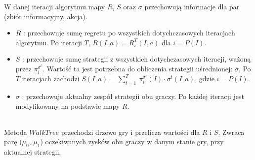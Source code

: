 \documentclass[licencjacka]{pracamgr}
\begin{document}
\noindent
W danej iteracji algorytmu mapy $R$, $S$ oraz $\sigma$ przechowują informacje
dla par (zbiór informacyjny, akcja).
\begin{itemize}
\item $R$ : przechowuje sumę regretu po wszystkich dotychczasowych iteracjach algorytmu. Po iteracji $T$, $R(I, a) = R_i^T(I, a)$
        dla $i = P(I)$.
\item $S$ : przechowuje sumę strategii z wszystkich dotychczasowych iteracji, ważoną przez $\pi_i^{\sigma^t}$. Wartość ta jest
            potrzebna do obliczenia strategii uśrednionej: $\overline{\sigma}$. Po $T$ iteracjach zachodzi
            $S(I, a) = \sum\limits_{t=1}^T \, \pi_i^{\sigma^t}(I) \cdot \sigma^t(I, a)$, gdzie $i = P(I)$.
\item $\sigma$ : przechowuje aktualny zespół strategii obu graczy. Po każdej iteracji jest modyfikowany na podstawie mapy $R$.
\end{itemize}

$\,$ \\

\noindent
Metoda $WalkTree$ przechodzi drzewo gry i przelicza wartości dla $R$ i $S$. Zwraca parę
($\mu_0$, $\mu_1$) oczekiwanych zysków obu graczy w danym stanie gry, przy aktualnej strategii. \\\\
\end{document}
